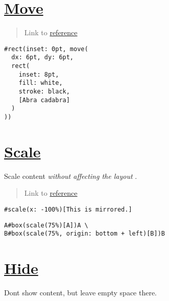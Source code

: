\section{\texorpdfstring{\hyperref[move]{Move}}{Move}}\label{move}

\begin{quote}
Link to \href{https://typst.app/docs/reference/layout/move/}{reference}
\end{quote}

\begin{verbatim}
#rect(inset: 0pt, move(
  dx: 6pt, dy: 6pt,
  rect(
    inset: 8pt,
    fill: white,
    stroke: black,
    [Abra cadabra]
  )
))
\end{verbatim}

\pandocbounded{}

\section{\texorpdfstring{\hyperref[scale]{Scale}}{Scale}}\label{scale}

Scale content \emph{without affecting the layout} .

\begin{quote}
Link to \href{https://typst.app/docs/reference/layout/scale/}{reference}
\end{quote}

\begin{verbatim}
#scale(x: -100%)[This is mirrored.]
\end{verbatim}

\pandocbounded{}

\begin{verbatim}
A#box(scale(75%)[A])A \
B#box(scale(75%, origin: bottom + left)[B])B
\end{verbatim}

\pandocbounded{}

\section{\texorpdfstring{\hyperref[hide]{Hide}}{Hide}}\label{hide}

Don\textquotesingle t show content, but leave empty space there.

